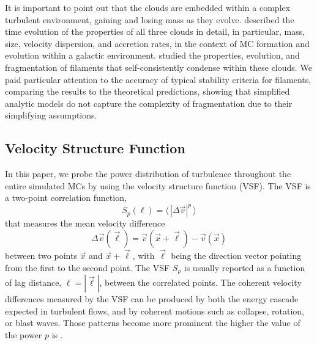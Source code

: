 It is important to point out that the clouds are embedded within a complex turbulent environment, gaining and losing mass as they evolve.
 described the time evolution of the properties of all three clouds in detail, in particular, mass, size, velocity dispersion, and accretion rates, in the context of MC formation and evolution within a galactic environment.
 studied the properties, evolution, and fragmentation of filaments that self-consistently condense within these clouds. 
We paid particular attention to the accuracy of typical stability criteria for filaments, comparing the results to the theoretical predictions, showing that simplified analytic models do not capture the complexity of fragmentation due to their simplifying assumptions.


\subsection{Velocity Structure Function}\label{methods:vsf}

In this paper, we probe the power distribution of turbulence throughout the entire simulated MCs by using the velocity structure function (VSF).
The VSF is a two-point correlation function,
\begin{equation}
	{S}_p (\ell) = \langle \, |\Delta \vec{v}|^p  \, \rangle
	\label{equ:method:def_vsf}
\end{equation}
that measures the mean velocity difference 
\begin{equation}
    \Delta \vec{v} (\vec{\ell}) = \vec{v}(\vec{x}+\vec{\ell}) - \vec{v}(\vec{x})
\end{equation} 
between two points $\vec{x}$ and $\vec{x}+\vec{\ell}$, with $\vec{\ell}$ being the direction vector pointing from the first to the second point.
The VSF $S_p$ is usually reported as a function of lag distance, $\ell = |\vec{\ell}|$, between the correlated points.
The coherent velocity differences measured by the VSF can be produced by both the energy cascade expected in turbulent flows, and by coherent motions such as collapse, rotation, or blast waves.
Those patterns become more prominent the higher the value of the power $p$ is \citep{Heyer2004}.

